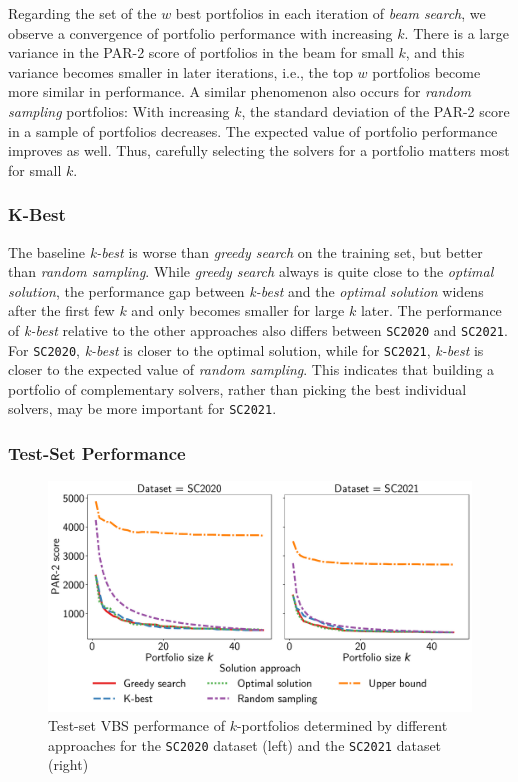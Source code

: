 \documentclass[a4paper,USenglish,pdfa]{lipics-v2021} %
\begin{document}
Regarding the set of the $w$ best portfolios in each iteration of \emph{beam search}, we observe a convergence of portfolio performance with increasing $k$. 
There is a large variance in the PAR-2 score of portfolios in the beam for small $k$, and this variance becomes smaller in later iterations, i.e., the top $w$ portfolios become more similar in performance.
A similar phenomenon also occurs for \emph{random sampling} portfolios:
With increasing $k$, the standard deviation of the PAR-2 score in a sample of portfolios decreases.
The expected value of portfolio performance improves as well.
Thus, carefully selecting the solvers for a portfolio matters most for small $k$.

\subsubsection{K-Best}

The baseline \emph{k-best} is worse than \emph{greedy search} on the training set, but better than \emph{random sampling}.
While \emph{greedy search} always is quite close to the \emph{optimal solution}, the performance gap between \emph{k-best} and the \emph{optimal solution} widens after the first few $k$ and only becomes smaller for large $k$ later.
The performance of \emph{k-best} relative to the other approaches also differs between \texttt{SC2020} and \texttt{SC2021}.
For \texttt{SC2020}, \emph{k-best} is closer to the optimal solution, while for \texttt{SC2021}, \emph{k-best} is closer to the expected value of \emph{random sampling}.
This indicates that building a portfolio of complementary solvers, rather than picking the best individual solvers, may be more important for \texttt{SC2021}. 

\subsubsection{Test-Set Performance}

\begin{figure}[htb]
	\centering
	\includegraphics[width=\columnwidth]{plots/search-test-objective.pdf}
	\caption{Test-set VBS performance of $k$-portfolios determined by different approaches for the \texttt{SC2020} dataset (left) and the \texttt{SC2021} dataset (right)}
	\label{fig:search-test-objective}
\end{figure}
\end{document}
